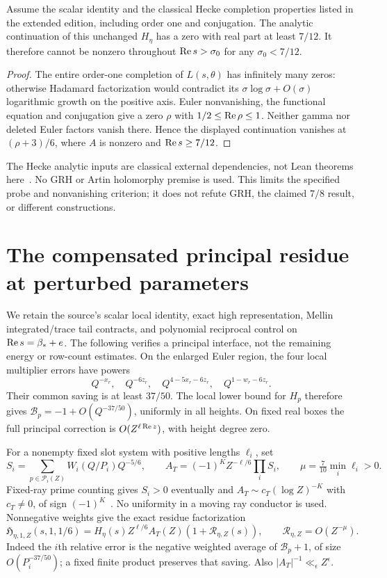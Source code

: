 \begin{proposition}
Assume the scalar identity and the classical Hecke completion properties
listed in the extended edition, including order one and conjugation.
The analytic continuation of this unchanged $H_\eta$ has a zero with
real part at least $7/12$. It therefore cannot be nonzero throughout
$\operatorname{Re} s>\sigma_0$ for any $\sigma_0<7/12$.
\end{proposition}
\begin{proof}
The entire order-one completion of $L(s,\theta)$ has infinitely many
zeros: otherwise Hadamard factorization would contradict its
$\sigma\log\sigma+O(\sigma)$ logarithmic growth on the positive axis.
Euler nonvanishing, the functional equation and conjugation give a zero
$\rho$ with $1/2\le\operatorname{Re}\rho\le1$. Neither gamma nor deleted Euler
factors vanish there. Hence the displayed continuation vanishes at
$(\rho+3)/6$, where $A$ is nonzero and $\operatorname{Re} s\ge7/12$.
\end{proof}
The Hecke analytic inputs are classical external dependencies, not Lean
theorems here~\cite{tate,white}. No GRH or Artin holomorphy premise is
used. This limits the specified probe and nonvanishing criterion; it
does not refute GRH, the claimed $7/8$ result, or different constructions.

\section{The compensated principal residue at perturbed parameters}
We retain the source's scalar local identity, exact high representation,
Mellin integrated/trace tail contracts, and polynomial reciprocal control
on $\operatorname{Re} s=\beta_*+e$. The following verifies a principal interface,
not the remaining energy or row-count estimates.
On the enlarged Euler region, the four local multiplier errors have powers
\[
 Q^{-x_r},\quad Q^{-6z_r},\quad Q^{4-5x_r-6z_r},\quad Q^{1-w_r-6z_r}.
\]
Their common saving is at least $37/50$. The local lower bound for $H_p$
therefore gives $\mathcal B_p=-1+O(Q^{-37/50})$, uniformly in all heights.
On fixed real boxes the full principal correction is
$O(Z^{\ell\operatorname{Re} z})$, with height degree zero.

For a nonempty fixed slot system with positive lengths $\ell_i$, set
\[
 S_i=\sum_{p\in\mathcal P_i(Z)}W_i(Q/P_i)Q^{-5/6},\qquad
 A_T=(-1)^KZ^{-\ell/6}\prod_iS_i,\qquad
 \mu=\tfrac7{10}\min_i\ell_i>0.
\]
Fixed-ray prime counting gives $S_i>0$ eventually and
$A_T\sim c_T(\log Z)^{-K}$ with $c_T\ne0$, of sign $(-1)^K$~\cite{tz}.
No uniformity in a moving ray conductor is used. Nonnegative weights give
the exact residue factorization
\[
 \mathfrak H_{\eta,1,Z}(s,1,1/6)
 =H_\eta(s)Z^{\ell/6}A_T(Z)(1+\mathcal R_{\eta,Z}(s)),\qquad
 \mathcal R_{\eta,Z}=O(Z^{-\mu}).
\]
Indeed the $i$th relative error is the negative weighted average of
$\mathcal B_p+1$, of size $O(P_i^{-37/50})$; a fixed finite product
preserves that saving. Also $|A_T|^{-1}\ll_\epsilon Z^\epsilon$.

